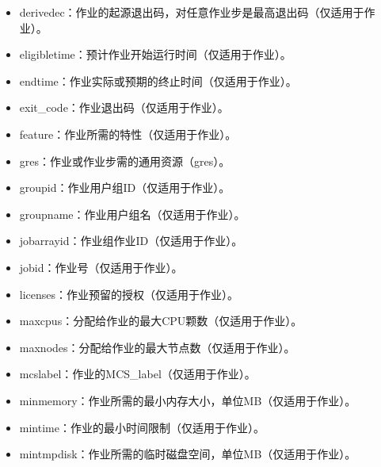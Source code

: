 \documentclass[a4paper,12pt,english]{sphinxmanual}
\begin{document}
\begin{itemize}
\begin{itemize}
\begin{itemize}
\item {} 
\sphinxAtStartPar
derivedec：作业的起源退出码，对任意作业步是最高退出码（仅适用于作业）。

\item {} 
\sphinxAtStartPar
eligibletime：预计作业开始运行时间（仅适用于作业）。

\item {} 
\sphinxAtStartPar
endtime：作业实际或预期的终止时间（仅适用于作业）。

\item {} 
\sphinxAtStartPar
exit\_code：作业退出码（仅适用于作业）。

\item {} 
\sphinxAtStartPar
feature：作业所需的特性（仅适用于作业）。

\item {} 
\sphinxAtStartPar
gres：作业或作业步需的通用资源（gres）。

\item {} 
\sphinxAtStartPar
groupid：作业用户组ID（仅适用于作业）。

\item {} 
\sphinxAtStartPar
groupname：作业用户组名（仅适用于作业）。

\item {} 
\sphinxAtStartPar
jobarrayid：作业组作业ID（仅适用于作业）。

\item {} 
\sphinxAtStartPar
jobid：作业号（仅适用于作业）。

\item {} 
\sphinxAtStartPar
licenses：作业预留的授权（仅适用于作业）。

\item {} 
\sphinxAtStartPar
maxcpus：分配给作业的最大CPU颗数（仅适用于作业）。

\item {} 
\sphinxAtStartPar
maxnodes：分配给作业的最大节点数（仅适用于作业）。

\item {} 
\sphinxAtStartPar
mcslabel：作业的MCS\_label（仅适用于作业）。

\item {} 
\sphinxAtStartPar
minmemory：作业所需的最小内存大小，单位MB（仅适用于作业）。

\item {} 
\sphinxAtStartPar
mintime：作业的最小时间限制（仅适用于作业）。

\item {} 
\sphinxAtStartPar
mintmpdisk：作业所需的临时磁盘空间，单位MB（仅适用于作业）。


\end{itemize}
\end{itemize}
\end{itemize}
\end{document}
